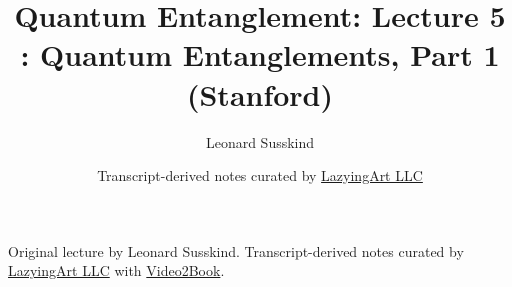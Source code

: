 \documentclass[11pt,oneside]{book}
\begin{document}
\frontmatter
\title{Quantum Entanglement: Lecture 5 : Quantum Entanglements, Part 1 (Stanford)}
\author{Leonard Susskind}
\date{Transcript-derived notes curated by \href{https://lazying.art}{LazyingArt LLC}}
\maketitle
\begin{center}
\small Original lecture by Leonard Susskind. Transcript-derived notes curated by \href{https://lazying.art}{LazyingArt LLC} with \href{https://github.com/lachlanchen/Video2Book}{Video2Book}.
\end{center}
\clearpage
\mainmatter

\end{document}
